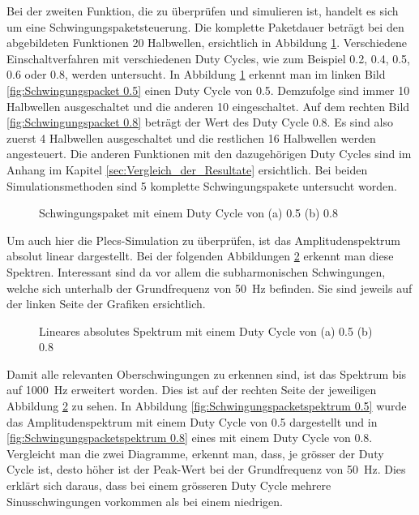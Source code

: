 Bei der zweiten Funktion, die zu überprüfen und simulieren ist, handelt es sich um eine Schwingungspaketsteuerung. Die komplette Paketdauer beträgt bei den abgebildeten Funktionen 20 Halbwellen, ersichtlich in Abbildung \ref{fig:Schwingungspaket Matlab}. Verschiedene Einschaltverfahren mit verschiedenen Duty Cycles, wie zum Beispiel 0.2, 0.4, 0.5, 0.6 oder 0.8, werden untersucht. In Abbildung \ref{fig:Schwingungspaket Matlab} erkennt man im linken Bild \ref{fig:Schwingungspacket 0.5} einen Duty Cycle von 0.5. Demzufolge sind immer 10 Halbwellen ausgeschaltet und die anderen 10 eingeschaltet.
Auf dem rechten Bild \ref{fig:Schwingungspacket 0.8} beträgt der Wert des Duty Cycle 0.8. Es sind also zuerst 4 Halbwellen ausgeschaltet und die restlichen 16 Halbwellen werden angesteuert. Die anderen Funktionen mit den dazugehörigen Duty Cycles sind im Anhang im Kapitel \ref{sec:Vergleich_der_Resultate} ersichtlich. Bei beiden Simulationsmethoden sind 5 komplette Schwingungspakete untersucht worden. 

\begin{figure}[ht!]
	\centering
	\qquad
	\caption{Schwingungspaket mit einem Duty Cycle von (a) 0.5 (b) 0.8}
	\label{fig:Schwingungspaket Matlab}
\end{figure} 

Um auch hier die Plecs-Simulation zu überprüfen, ist das Amplitudenspektrum absolut linear dargestellt. Bei der folgenden Abbildungen \ref{fig:Schwingungspaketspektrum Matlab} erkennt man diese Spektren. Interessant sind da vor allem die subharmonischen Schwingungen, welche sich unterhalb der Grundfrequenz von \SI{50}{Hz} befinden. Sie sind jeweils auf der linken Seite der Grafiken ersichtlich.   

\begin{figure}[ht!]
	\centering
	\qquad
	\caption{Lineares absolutes Spektrum mit einem Duty Cycle von (a) 0.5 (b) 0.8}
	\label{fig:Schwingungspaketspektrum Matlab}
\end{figure}

\newpage
Damit alle relevanten Oberschwingungen zu erkennen sind, ist das Spektrum bis auf \SI{1000}{Hz} erweitert worden. Dies ist auf der rechten Seite der jeweiligen Abbildung \ref{fig:Schwingungspaketspektrum Matlab} zu sehen. In Abbildung \ref{fig:Schwingungspacketspektrum 0.5} wurde das Amplitudenspektrum mit einem Duty Cycle von 0.5 dargestellt und in \ref{fig:Schwingungspacketspektrum 0.8} eines mit einem Duty Cycle von 0.8. Vergleicht man die zwei Diagramme, erkennt man, dass, je grösser der Duty Cycle ist, desto höher ist der Peak-Wert bei der Grundfrequenz von \SI{50}{Hz}. Dies erklärt sich daraus, dass bei einem grösseren Duty Cycle mehrere Sinusschwingungen vorkommen als bei einem niedrigen.\\


